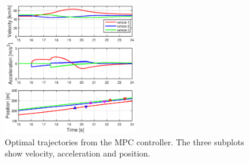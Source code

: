 \documentclass[letterpaper,10pt,conference]{ieeeconf}
\begin{document}
\begin{figure}[h!]
    \centering
    \includegraphics[width=0.52\textwidth]{plots_dpc}
    \caption{Optimal trajectories from the MPC controller. The three subplots show velocity, acceleration and position.}
    \label{fig:sim_results}
\end{figure}
\end{document}
